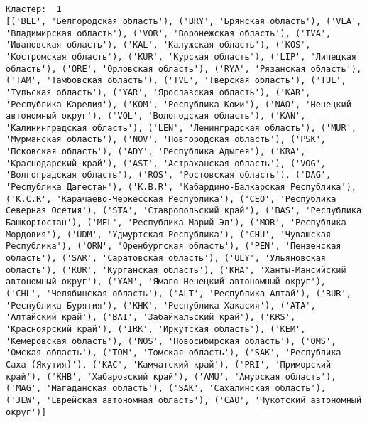 \documentclass[11pt]{article}
\begin{document}
    \begin{center}
    \end{center}
    { \hspace*{\fill} \\}
    
    \begin{Verbatim}[commandchars=\\\{\}]

Кластер:  1
[('BEL', 'Белгородская область'), ('BRY', 'Брянская область'), ('VLA', 'Владимирская область'), ('VOR', 'Воронежская область'), ('IVA', 'Ивановская область'), ('KAL', 'Калужская область'), ('KOS', 'Костромская область'), ('KUR', 'Курская область'), ('LIP', 'Липецкая область'), ('ORE', 'Орловская область'), ('RYA', 'Рязанская область'), ('TAM', 'Тамбовская область'), ('TVE', 'Тверская область'), ('TUL', 'Тульская область'), ('YAR', 'Ярославская область'), ('KAR', 'Республика Карелия'), ('KOM', 'Республика Коми'), ('NAO', 'Ненецкий автономный округ'), ('VOL', 'Вологодская область'), ('KAN', 'Калинингpадская область'), ('LEN', 'Ленинградская область'), ('MUR', 'Мурманская область'), ('NOV', 'Новгородская область'), ('PSK', 'Псковская область'), ('ADY', 'Республика Адыгея'), ('KRA', 'Краснодарский край'), ('AST', 'Астраханская область'), ('VOG', 'Волгоградская область'), ('ROS', 'Ростовская область'), ('DAG', 'Республика Дагестан'), ('K.B.R', 'Кабардино-Балкарская Республика'), ('K.C.R', 'Карачаево-Черкесская Республика'), ('CEO', 'Республика Северная Осетия'), ('STA', 'Ставропольский край'), ('BAS', 'Республика Башкортостан'), ('MEL', 'Республика Марий Эл'), ('MOR', 'Республика Мордовия'), ('UDM', 'Удмуртская Республика'), ('CHU', 'Чувашская Республика'), ('ORN', 'Оренбургская область'), ('PEN', 'Пензенская область'), ('SAR', 'Саратовская область'), ('ULY', 'Ульяновская область'), ('KUR', 'Курганская область'), ('KHA', 'Ханты-Мансийский автономный округ'), ('YAM', 'Ямало-Ненецкий автономный округ'), ('CHL', 'Челябинская область'), ('ALT', 'Республика Алтай'), ('BUR', 'Республика Бурятия'), ('KHK', 'Республика Хакасия'), ('ATA', 'Алтайский край'), ('BAI', 'Забайкальский край'), ('KRS', 'Красноярский край'), ('IRK', 'Иркутская область'), ('KEM', 'Кемеровская область'), ('NOS', 'Новосибирская область'), ('OMS', 'Омская область'), ('TOM', 'Томская область'), ('SAK', 'Республика Саха (Якутия)'), ('KAC', 'Камчатский край'), ('PRI', 'Приморский край'), ('KHB', 'Хабаровский край'), ('AMU', 'Амурская область'), ('MAG', 'Магаданская область'), ('SAK', 'Сахалинская область'), ('JEW', 'Еврейская автономная область'), ('CAO', 'Чукотский автономный округ')]


\end{Verbatim}
\end{document}
